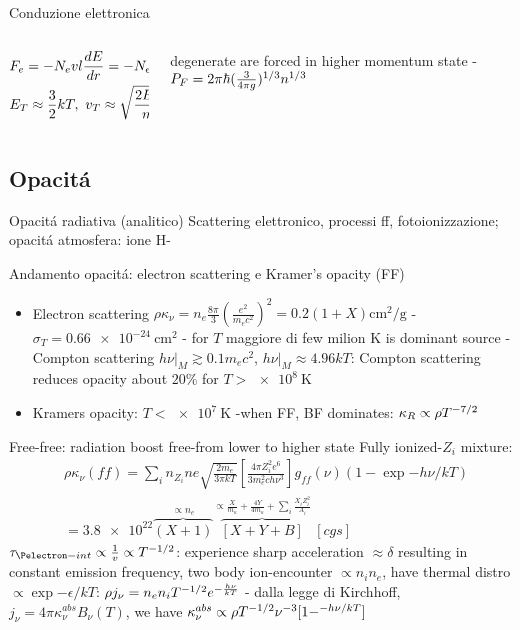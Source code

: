 \begin{frame}{Conduzione elettronica}
\begin{columns}[T]
\begin{column}{0.5\textwidth}
	\begin{align*}
	&F_e=-N_evl\TDy{r}{E}=-N_ekvl\TDy{r}{T}\\
	&E_T\approx\frac{3}{2}kT,\ v_T\approx\sqrt{\frac{2E_T}{m}}
	\end{align*}
\end{column}
\begin{column}{0.5\textwidth}
	\Pelectron degenerate are forced in higher momentum state - $P_F=2\pi\hbar(\frac{3}{4\pi g})\expy{1/3}n\expy{1/3}$
\end{column}
\end{columns}
\end{frame}

\subsection{Opacit\'a}

\begin{frame}{Opacit\'a radiativa (analitico)}
Scattering elettronico, processi ff, fotoionizzazione; opacit\'a atmosfera: ione H-
\end{frame}

\begin{frame}{Andamento opacit\'a: electron scattering e Kramer's opacity (FF)}
\begin{itemize}
\item Electron scattering $\rho\kappa_{\nu}=n_e\frac{8\pi}{3}(\frac{e^2}{m_ec^2})^2=0.2(1+X)\si{\square\cm\per\gram}$ - $\sigma_T=\SI{0.66e-24}{\square\cm}$ - for $T$ maggiore di few milion K is dominant source - Compton scattering $h\nu|_M\gtrsim0.1 m_ec^2$, $h\nu|_M\approx4.96kT$: Compton scattering reduces opacity about $20\%$ for $T>\SI{e8}{\kelvin}$
\item Kramers opacity: $T<\SI{e7}{\kelvin}$ -when FF, BF dominates: $\kappa_R\propto\rho T\expy{-7/2}$
\end{itemize}
\begin{block}{Free-free: radiation boost free-\Pelectron from lower to higher state}
Fully ionized-$Z_i$ mixture: 
\begin{align*}
&\rho\kappa_{\nu}(ff)=\sum_in_{Z_i}ne\sqrt{\frac{2m_e}{3\pi kT}}[\frac{4\pi Z_i^2e^6}{3m_e^2ch\nu^3}]g_{ff}(\nu)(1-\exp{-h\nu/kT})\\
&=\num{3.8e22}\overbrace{(X+1)}^{\propto n_e}\overbrace{[X+Y+B]}^{\propto\frac{X}{m_u}+\frac{4Y}{4m_u}+\sum_i\frac{X_iZ_i^2}{A_i}}\ [\si{cgs}]
\end{align*}
$\tau_{\Pelectron-int}\propto\frac{1}{v}\propto T\expy{-1/2}$: \Pelectron experience sharp acceleration $\approx\delta$ resulting in constant emission frequency, two body ion-\Pelectron encounter $\propto n_in_e$, \Pelectron have thermal distro $\propto\exp{-\epsilon/kT}$: $\rho j_{\nu}=n_en_iT\expy{-1/2}\exp{-\frac{h\nu}{kT}}$ - dalla legge di Kirchhoff, $j_{\nu}=4\pi\kappa_{\nu}^{abs}B_{\nu}(T)$, we have $\kappa_{\nu}^{abs}\propto\rho T\expy{-1/2}\nu\expy{-3}[1-\expy{-h\nu/kT}]$
\end{block}
\end{frame}

